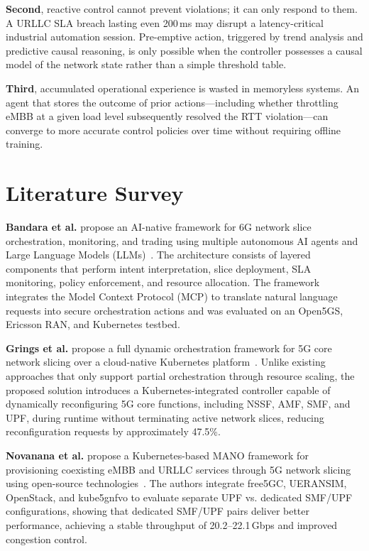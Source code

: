 \textbf{Second}, reactive control cannot prevent violations; it can only respond to them. A URLLC SLA breach lasting even 200\,ms may disrupt a latency-critical industrial automation session. Pre-emptive action, triggered by trend analysis and predictive causal reasoning, is only possible when the controller possesses a causal model of the network state rather than a simple threshold table.

\textbf{Third}, accumulated operational experience is wasted in memoryless systems. An agent that stores the outcome of prior actions---including whether throttling eMBB at a given load level subsequently resolved the RTT violation---can converge to more accurate control policies over time without requiring offline training.

\section{Literature Survey}

\textbf{Bandara et al.} propose an AI-native framework for 6G network slice orchestration, monitoring, and trading using multiple autonomous AI agents and Large Language Models (LLMs)~\cite{bandara2026}. The architecture consists of layered components that perform intent interpretation, slice deployment, SLA monitoring, policy enforcement, and resource allocation. The framework integrates the Model Context Protocol (MCP) to translate natural language requests into secure orchestration actions and was evaluated on an Open5GS, Ericsson RAN, and Kubernetes testbed.

\textbf{Grings et al.} propose a full dynamic orchestration framework for 5G core network slicing over a cloud-native Kubernetes platform~\cite{grings2022}. Unlike existing approaches that only support partial orchestration through resource scaling, the proposed solution introduces a Kubernetes-integrated controller capable of dynamically reconfiguring 5G core functions, including NSSF, AMF, SMF, and UPF, during runtime without terminating active network slices, reducing reconfiguration requests by approximately 47.5\%.

\textbf{Novanana et al.} propose a Kubernetes-based MANO framework for provisioning coexisting eMBB and URLLC services through 5G network slicing using open-source technologies~\cite{novanana2024}. The authors integrate free5GC, UERANSIM, OpenStack, and kube5gnfvo to evaluate separate UPF vs. dedicated SMF/UPF configurations, showing that dedicated SMF/UPF pairs deliver better performance, achieving a stable throughput of 20.2--22.1\,Gbps and improved congestion control.

